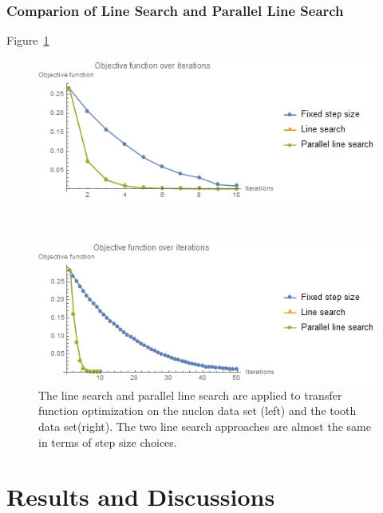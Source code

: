 \subsubsection{Comparion of Line Search and Parallel Line Search}

Figure~\ref{fig:nucleon_naive_tooth_naive_rms_linesearch}

\begin{figure}
	\centering
	\begin{minipage}{.49\textwidth}
		\includegraphics[width=1\linewidth]{images/nucleon_naive_rms_fixed_linesearch_parallel}
	\end{minipage}~
	\begin{minipage}{.49\textwidth}
		\includegraphics[width=1\linewidth]{images/tooth_naive_rms_fixed_linesearch_parallel}	
	\end{minipage}
	\caption{The line search and parallel line search are applied to transfer function optimization on the nuclon data set (left) and the tooth data set(right). The two line search approaches are almost the same in terms of step size choices.}
	\label{fig:nucleon_naive_tooth_naive_rms_linesearch}
\end{figure}

\section{Results and Discussions}


